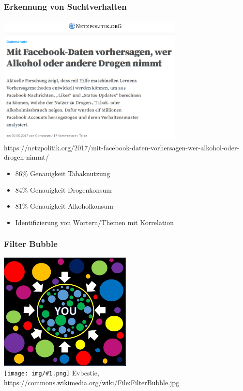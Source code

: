 \documentclass[12pt]{beamer}
\newcommand{\cc}[1]{\texttt{[image: img/\#1.png]}\hspace{1mm}}
\begin{document}
\begin{frame}
  \frametitle{Erkennung von Suchtverhalten}
   {
    \begin{center}
      \includegraphics[width=0.7\textwidth]{img/facebook_drogen.png} \\
      \tiny https://netzpolitik.org/2017/mit-facebook-daten-vorhersagen-wer-alkohol-oder-drogen-nimmt/
    \end{center}
  }
   {
    \begin{itemize}
      \item 86\% Genauigkeit Tabaknutzung
      \item 84\% Genauigkeit Drogenkonsum
      \item 81\% Genauigkeit Alkoholkonsum
      \item Identifizierung von Wörtern/Themen mit Korrelation
    \end{itemize}
  }
\end{frame}

\begin{frame}
  \frametitle{Filter Bubble}
  \begin{center}
    \includegraphics[width=0.5\textwidth]{img/FilterBubble.jpg} \\
    \vspace{0.5cm}
    \tiny \cc{by} Evbestie, https://commons.wikimedia.org/wiki/File:FilterBubble.jpg
  \end{center}
\end{frame}
\end{document}
